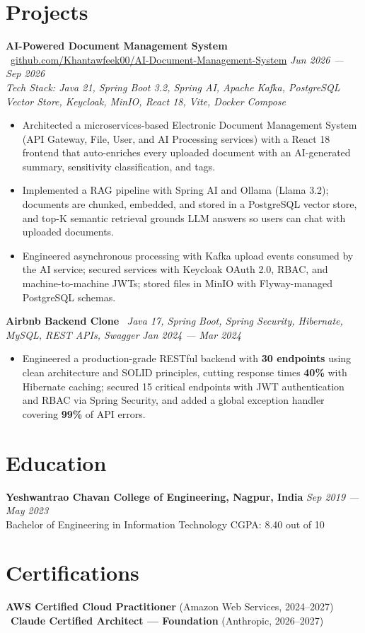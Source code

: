 \documentclass[10pt, letterpaper]{article}
\newcommand{\bulletlist}{\begin{itemize}[leftmargin=0.18in, itemsep=0pt, parsep=0pt, topsep=1pt]}
\newcommand{\bulletlistend}{\end{itemize}}
\begin{document}
\section{Projects}

\textbf{AI-Powered Document Management System} \textbar\ \href{https://github.com/Khantawfeek00/AI-Document-Management-System}{github.com/Khantawfeek00/AI-Document-Management-System} \hfill
\textit{Jun 2026 --- Sep 2026} \\
\textit{Tech Stack: Java 21, Spring Boot 3.2, Spring AI, Apache Kafka, PostgreSQL Vector Store, Keycloak, MinIO, React 18, Vite, Docker Compose}
\bulletlist
    \item Architected a microservices-based Electronic Document Management System (API Gateway, File, User, and AI Processing services) with a React 18 frontend that auto-enriches every uploaded document with an AI-generated summary, sensitivity classification, and tags.
    \item Implemented a RAG pipeline with Spring AI and Ollama (Llama 3.2); documents are chunked, embedded, and stored in a PostgreSQL vector store, and top-K semantic retrieval grounds LLM answers so users can chat with uploaded documents.
    \item Engineered asynchronous processing with Kafka upload events consumed by the AI service; secured services with Keycloak OAuth 2.0, RBAC, and machine-to-machine JWTs; stored files in MinIO with Flyway-managed PostgreSQL schemas.
\bulletlistend

\textbf{Airbnb Backend Clone} \textbar\ \textit{Java 17, Spring Boot, Spring Security, Hibernate, MySQL, REST APIs, Swagger} \hfill \textit{Jan 2024 --- Mar 2024}
\bulletlist
    \item Engineered a production-grade RESTful backend with \textbf{30 endpoints} using clean architecture and SOLID principles, cutting response times \textbf{40\%} with Hibernate caching; secured 15 critical endpoints with JWT authentication and RBAC via Spring Security, and added a global exception handler covering \textbf{99\%} of API errors.
\bulletlistend

\section{Education}
\textbf{Yeshwantrao Chavan College of Engineering, Nagpur, India} \hfill \textit{Sep 2019 --- May 2023} \\
Bachelor of Engineering in Information Technology \hfill CGPA: 8.40 out of 10

\section{Certifications}
\textbf{AWS Certified Cloud Practitioner} (Amazon Web Services, 2024--2027) \textbar\ \textbf{Claude Certified Architect --- Foundation} (Anthropic, 2026--2027)
\end{document}
